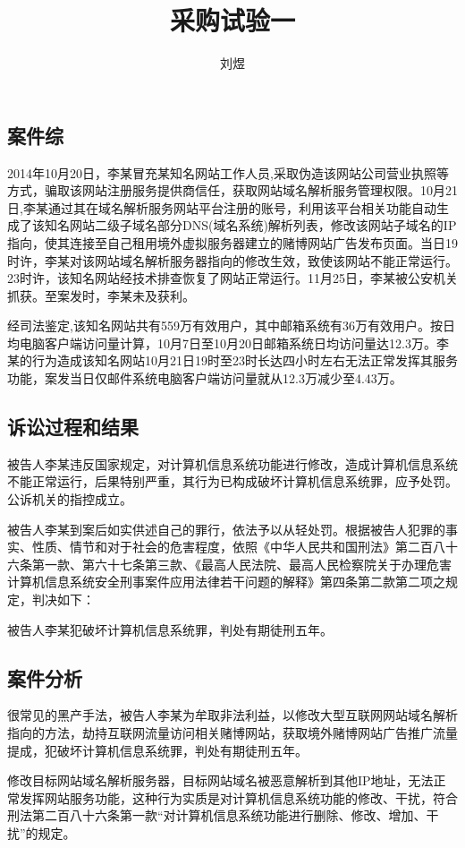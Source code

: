 \documentclass[a4paper,12pt]{article}
\title{采购试验一}
\author{刘煜}
\begin{document}
        
    \subsection{案件综}
    

   
    2014年10月20日，李某冒充某知名网站工作人员,采取伪造该网站公司营业执照等方式，骗取该网站注册服务提供商信任，获取网站域名解析服务管理权限。10月21日,李某通过其在域名解析服务网站平台注册的账号，利用该平台相关功能自动生成了该知名网站二级子域名部分DNS(域名系统)解析列表，修改该网站子域名的IP指向，使其连接至自己租用境外虚拟服务器建立的赌博网站广告发布页面。当日19时许，李某对该网站域名解析服务器指向的修改生效，致使该网站不能正常运行。23时许，该知名网站经技术排查恢复了网站正常运行。11月25日，李某被公安机关抓获。至案发时，李某未及获利。

    经司法鉴定,该知名网站共有559万有效用户，其中邮箱系统有36万有效用户。按日均电脑客户端访问量计算，10月7日至10月20日邮箱系统日均访问量达12.3万。李某的行为造成该知名网站10月21日19时至23时长达四小时左右无法正常发挥其服务功能，案发当日仅邮件系统电脑客户端访问量就从12.3万减少至4.43万。
    
    \subsection{诉讼过程和结果}
    被告人李某违反国家规定，对计算机信息系统功能进行修改，造成计算机信息系统不能正常运行，后果特别严重，其行为已构成破坏计算机信息系统罪，应予处罚。公诉机关的指控成立。

    被告人李某到案后如实供述自己的罪行，依法予以从轻处罚。根据被告人犯罪的事实、性质、情节和对于社会的危害程度，依照《中华人民共和国刑法》第二百八十六条第一款、第六十七条第三款、《最高人民法院、最高人民检察院关于办理危害计算机信息系统安全刑事案件应用法律若干问题的解释》第四条第二款第二项之规定，判决如下：


    被告人李某犯破坏计算机信息系统罪，判处有期徒刑五年。

    \subsection{案件分析}
    很常见的黑产手法，被告人李某为牟取非法利益，以修改大型互联网网站域名解析指向的方法，劫持互联网流量访问相关赌博网站，获取境外赌博网站广告推广流量提成，犯破坏计算机信息系统罪，判处有期徒刑五年。

    修改目标网站域名解析服务器，目标网站域名被恶意解析到其他IP地址，无法正常发挥网站服务功能，这种行为实质是对计算机信息系统功能的修改、干扰，符合刑法第二百八十六条第一款“对计算机信息系统功能进行删除、修改、增加、干扰”的规定。
\end{document}
